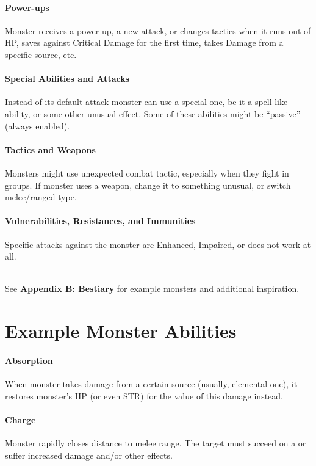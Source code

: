 \documentclass[itdr]{subfiles}
\begin{document}
\paragraph{Power-ups}
Monster receives a power-up, a new attack, or changes tactics when it runs out of HP, saves against Critical Damage for the first time, takes Damage from a specific source, etc.

\paragraph{Special Abilities and Attacks}
Instead of its default attack monster can use a special one, be it a spell-like ability, or some other unusual effect. Some of these abilities might be ``passive'' (always enabled).

\paragraph{Tactics and Weapons}
Monsters might use unexpected combat tactic, especially when they fight in groups. If monster uses a weapon, change it to something unusual, or switch melee/ranged type.

\paragraph{Vulnerabilities, Resistances, and Immunities}
Specific attacks against the monster are Enhanced, Impaired, or does not work at all.

\begin{dbox}
	~\\
	See \textbf{Appendix B: Bestiary} for example monsters and additional inspiration.
\end{dbox}

\break

\section{Example Monster Abilities}

\paragraph{Absorption}
When monster takes damage from a certain source (usually, elemental one), it restores monster's HP (or even STR) for the value of this damage instead.

\paragraph{Charge}
Monster rapidly closes distance to melee range. The target must succeed on a  or suffer increased damage and/or other effects.
\end{document}
